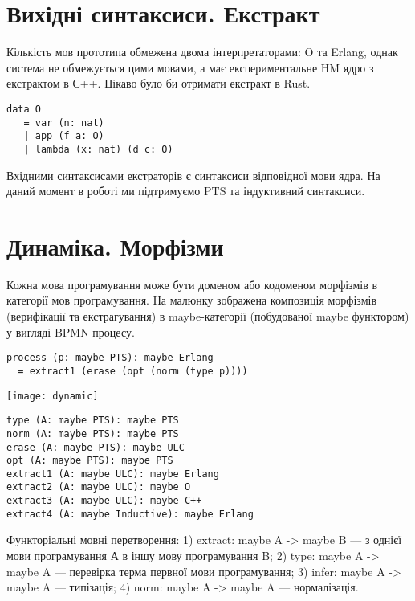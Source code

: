 \section{Вихідні синтаксиси. Екстракт}
Кількість мов прототипа обмежена двома інтерпретаторами: O та Erlang,
однак система не обмежується цими мовами, а має експериментальне HM ядро
з екстрактом в С++. Цікаво було би отримати екстракт в Rust.

\begin{lstlisting}[mathescape=true]
data O
   = var (n: nat)
   | app (f a: O)
   | lambda (x: nat) (d c: O)
\end{lstlisting}

Вхідними синтаксисами екстраторів є синтаксиси відповідної мови ядра.
На даний момент в роботі ми підтримуємо PTS та індуктивний синтаксиси.

\section{Динаміка. Морфізми}

Кожна мова програмування може бути доменом або кодоменом
морфізмів в категорії мов програмування. На малюнку зображена
композиція морфізмів (верифікації та екстрагування)
в maybe-категорії (побудованої maybe функтором) у вигляді BPMN процесу.

\begin{lstlisting}[mathescape=true]
process (p: maybe PTS): maybe Erlang
  = extract1 (erase (opt (norm (type p))))
\end{lstlisting}

\texttt{[image: dynamic]}

\begin{lstlisting}[mathescape=true]
type (A: maybe PTS): maybe PTS
norm (A: maybe PTS): maybe PTS
erase (A: maybe PTS): maybe ULC
opt (A: maybe PTS): maybe PTS
extract1 (A: maybe ULC): maybe Erlang
extract2 (A: maybe ULC): maybe O
extract3 (A: maybe ULC): maybe C++
extract4 (A: maybe Inductive): maybe Erlang
\end{lstlisting}

Функторіальні мовні перетворення: 1) extract: maybe A -> maybe B --- з однієї
мови програмування А в іншу мову програмування B; 2) type: maybe A -> maybe A
--- перевірка терма первної мови програмування; 3) infer: maybe A -> maybe A
--- типізація; 4) norm: maybe A -> maybe A --- нормалізація.


